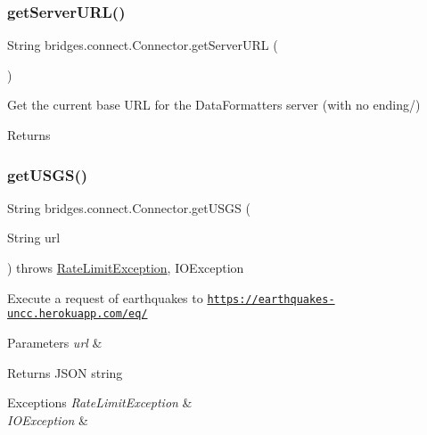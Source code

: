 \subsubsection{\texorpdfstring{get\+Server\+U\+R\+L()}{getServerURL()}}
{\footnotesize\ttfamily String bridges.\+connect.\+Connector.\+get\+Server\+U\+RL (\begin{DoxyParamCaption}{ }\end{DoxyParamCaption})}

Get the current base U\+RL for the Data\+Formatters server (with no ending/) \begin{DoxyReturn}{Returns}

\end{DoxyReturn}
\mbox{\label{classbridges_1_1connect_1_1_connector_a1781405c9b38c338bce042bf7ff23eaf}} 
\subsubsection{\texorpdfstring{get\+U\+S\+G\+S()}{getUSGS()}}
{\footnotesize\ttfamily String bridges.\+connect.\+Connector.\+get\+U\+S\+GS (\begin{DoxyParamCaption}\item[{String}]{url }\end{DoxyParamCaption}) throws \mbox{\hyperlink{classbridges_1_1validation_1_1_rate_limit_exception}{Rate\+Limit\+Exception}}, I\+O\+Exception}

Execute a request of earthquakes to \href{https://earthquakes-uncc.herokuapp.com/eq/}{\tt https\+://earthquakes-\/uncc.\+herokuapp.\+com/eq/} 
\begin{DoxyParams}{Parameters}
{\em url} & \\
\hline
\end{DoxyParams}
\begin{DoxyReturn}{Returns}
J\+S\+ON string 
\end{DoxyReturn}

\begin{DoxyExceptions}{Exceptions}
{\em Rate\+Limit\+Exception} & \\
\hline
{\em I\+O\+Exception} & \\
\hline
\end{DoxyExceptions}
\mbox{\label{classbridges_1_1connect_1_1_connector_a2318cd93d18ef58285598f6f9cdf727b}} 

